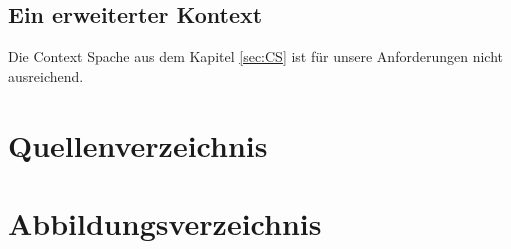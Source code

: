 \documentclass[a4paper]{article}
\begin{document}
	\subsection{Ein erweiterter Kontext}
	
	Die Context Spache aus dem Kapitel \ref{sec:CS} ist für unsere Anforderungen
	nicht ausreichend.
	
	\newpage
	
	\section{Quellenverzeichnis}	
	\printbibliography[type=book,heading=subbibliography,title={Bücher}]
	\printbibliography[type=manual,heading=subbibliography,title={Handbücher}]
	\printbibliography[type=online,heading=subbibliography,title={Webseiten}]
	\newpage
	
	\section{Abbildungsverzeichnis}
	\makeatletter
	\makeatother
\end{document}
